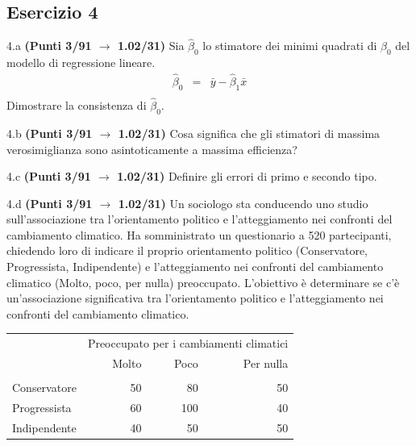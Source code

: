 \documentclass[
  11pt,
]{book}
\theoremstyle{mytheoremstyle}
\theoremstyle{mydefstyle}
\begin{document}
\subsection{Esercizio 4}\label{esercizio-4-33}

4.a \textbf{(Punti 3/91 \(\rightarrow\) 1.02/31)} Sia \(\hat \beta_0\) lo stimatore dei minimi quadrati di \(\beta_0\) del modello di regressione lineare.
\begin{eqnarray*}
  \hat\beta_0 &=&\bar y-  \hat\beta_1\bar x\\
\end{eqnarray*}
Dimostrare la consistenza di \(\hat\beta_0\).

4.b \textbf{(Punti 3/91 \(\rightarrow\) 1.02/31)} Cosa significa che gli stimatori di massima verosimiglianza sono asintoticamente a massima efficienza?

4.c \textbf{(Punti 3/91 \(\rightarrow\) 1.02/31)} Definire gli errori di primo e secondo tipo.

4.d \textbf{(Punti 3/91 \(\rightarrow\) 1.02/31)} Un sociologo sta conducendo uno studio sull'associazione tra l'orientamento politico e l'atteggiamento nei confronti del cambiamento climatico. Ha somministrato un questionario a 520 partecipanti, chiedendo loro di indicare il proprio orientamento politico (Conservatore, Progressista, Indipendente) e l'atteggiamento nei confronti del cambiamento climatico (Molto, poco, per nulla) preoccupato. L'obiettivo è determinare se c'è un'associazione significativa tra l'orientamento politico e l'atteggiamento nei confronti del cambiamento climatico.

\begin{table}[H]
\centering\centering\centering
\begin{tabular}{lrrr}
\toprule
\multicolumn{1}{c}{ } & \multicolumn{3}{c}{Preoccupato per i cambiamenti climatici} \\
\cmidrule(l{3pt}r{3pt}){2-4}
  & Molto & Poco & Per nulla\\
\midrule
\addlinespace[0.3em]
\multicolumn{4}{l}{\textbf{Orientamento politico}}\\
\hspace{1em}Conservatore & 50 & 80 & 50\\
\hspace{1em}Progressista & 60 & 100 & 40\\
\hspace{1em}Indipendente & 40 & 50 & 50\\
\bottomrule
\end{tabular}
\end{table}
\end{document}
